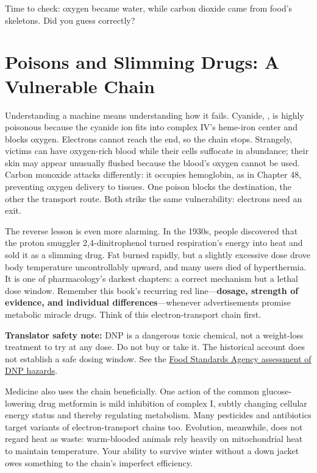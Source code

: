 Time to check: oxygen became water, while carbon dioxide came from food's skeletons. Did you guess correctly?

\section{Poisons and Slimming Drugs: A Vulnerable Chain}

Understanding a machine means understanding how it fails. Cyanide, , is highly poisonous because the cyanide ion fits into complex IV's heme-iron center and blocks oxygen. Electrons cannot reach the end, so the chain stops. Strangely, victims can have oxygen-rich blood while their cells suffocate in abundance; their skin may appear unusually flushed because the blood's oxygen cannot be used. Carbon monoxide attacks differently: it occupies hemoglobin, as in Chapter 48, preventing oxygen delivery to tissues. One poison blocks the destination, the other the transport route. Both strike the same vulnerability: electrons need an exit.

The reverse lesson is even more alarming. In the 1930s, people discovered that the proton smuggler 2,4-dinitrophenol turned respiration's energy into heat and sold it as a slimming drug. Fat burned rapidly, but a slightly excessive dose drove body temperature uncontrollably upward, and many users died of hyperthermia. It is one of pharmacology's darkest chapters: a correct mechanism but a lethal dose window. Remember this book's recurring red line---\textbf{dosage, strength of evidence, and individual differences}---whenever advertisements promise metabolic miracle drugs. Think of this electron-transport chain first.

\textbf{Translator safety note:} DNP is a dangerous toxic chemical, not a weight-loss treatment to try at any dose. Do not buy or take it. The historical account does not establish a safe dosing window. See the \href{https://www.food.gov.uk/sites/default/files/media/document/food-crime-strategic-assessment-2020.pdf}{Food Standards Agency assessment of DNP hazards}.

Medicine also uses the chain beneficially. One action of the common glucose-lowering drug metformin is mild inhibition of complex I, subtly changing cellular energy status and thereby regulating metabolism. Many pesticides and antibiotics target variants of electron-transport chains too. Evolution, meanwhile, does not regard heat as waste: warm-blooded animals rely heavily on mitochondrial heat to maintain temperature. Your ability to survive winter without a down jacket owes something to the chain's imperfect efficiency.

